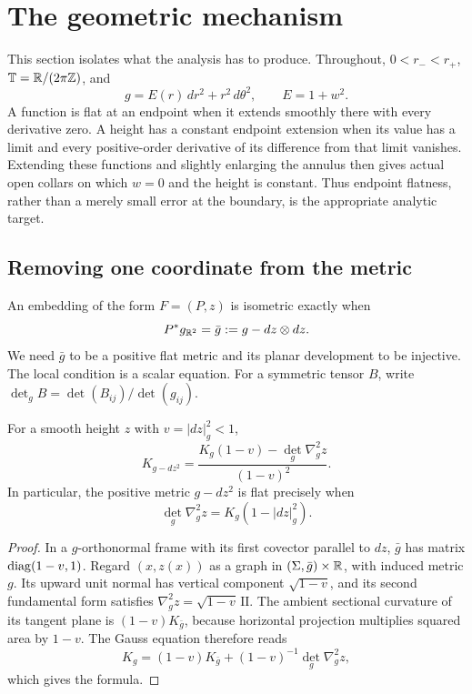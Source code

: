\section{The geometric mechanism}
\label{sec:geometric-closure}

This section isolates what the analysis has to produce. Throughout,
$0<r_-<r_+$, $\mathbb T=\mathbb R/(2\pi\mathbb Z)$, and
\begin{equation}\label{eq:intro-metric}
 g=E(r)\,dr^2+r^2\,d\theta^2,\qquad E=1+w^2.
\end{equation}
A function is flat at an endpoint when it extends smoothly there
with every derivative zero. A height has a constant endpoint extension
when its value has a limit and every positive-order derivative of its
difference from that limit vanishes. Extending these functions and
slightly enlarging the annulus then gives actual open collars on
which $w=0$ and the height is constant. Thus endpoint flatness, rather
than a merely small error at the boundary, is the appropriate analytic
target.
\label{def:flat-endpoint}

\subsection{Removing one coordinate from the metric}

An embedding of the form $F=(P,z)$ is isometric exactly when
\[
 P^*g_{\mathbb R^2}=\bar g:=g-dz\otimes dz.
\]
We need $\bar g$ to be a positive flat metric and its planar
development to be injective. The local condition is a scalar equation.
For a symmetric tensor $B$, write
$\det_g B=\det(B_{ij})/\det(g_{ij})$.

\begin{lemma}\label{lem:darboux-invariant}
For a smooth height $z$ with $v=|dz|_g^2<1$,
\begin{equation}\label{eq:darboux-curvature}
 K_{g-dz^2}=
 \frac{K_g(1-v)-\det_g\nabla_g^2z}{(1-v)^2}.
\end{equation}
In particular, the positive metric $g-dz^2$ is flat precisely when
\begin{equation}\label{eq:intro-darboux}
 \det_g\nabla_g^2z=K_g(1-|dz|_g^2).
\end{equation}
\end{lemma}

\begin{proof}
In a $g$-orthonormal frame with its first covector parallel to $dz$,
$\bar g$ has matrix $\operatorname{diag}(1-v,1)$. Regard $(x,z(x))$ as a graph
in $(\Sigma,\bar g)\times\mathbb R$, with induced metric $g$. Its upward
unit normal has vertical component $\sqrt{1-v}$, and its second
fundamental form satisfies
$\nabla_g^2z=\sqrt{1-v}\,\mathrm{II}$.
The ambient sectional curvature of its tangent plane is
$(1-v)K_{\bar g}$, because horizontal projection multiplies squared
area by $1-v$. The Gauss equation therefore reads
\[
 K_g=(1-v)K_{\bar g}+(1-v)^{-1}\det_g\nabla_g^2z,
\]
which gives the formula.
\end{proof}

